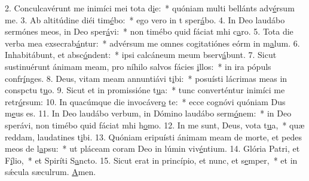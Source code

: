 2. Conculcavérunt me inimíci mei tota d\uline{i}e:~* quóniam multi bellánts adv\uline{é}rsum me.
3. Ab altitúdine diéi tim\uline{é}bo:~* ego vero in t sper\uline{á}bo.
4. In Deo laudábo sermónes meos, in Deo sper\uline{á}vi:~* non timébo quid fáciat mhi c\uline{a}ro.
5. Tota die verba mea exsecrab\uline{á}ntur:~* advérsum me omnes cogitatiónes eórm in m\uline{a}lum.
6. Inhabitábunt, et absc\uline{ó}ndent:~* ipsi calcáneum meum bserv\uline{á}bunt.
7. Sicut sustinuérunt ánimam meam, pro níhilo salvos fácies \uline{i}llos:~* in ira pópuls confr\uline{í}nges.
8. Deus, vitam meam annuntiávi t\uline{i}bi:~* posuísti lácrimas meas in conspctu t\uline{u}o.
9. Sicut et in promissióne t\uline{u}a:~* tunc converténtur inimíci me retr\uline{ó}rsum:
10. In quacúmque die invocáver\uline{o} te:~* ecce cognóvi quóniam Dus m\uline{e}us es.
11. In Deo laudábo verbum, in Dómino laudábo serm\uline{ó}nem:~* in Deo sperávi, non timébo quid fáciat mhi h\uline{o}mo.
12. In me sunt, Deus, vota t\uline{u}a,~* quæ reddam, laudatines t\uline{i}bi.
13. Quóniam eripuísti ánimam meam de morte, et pedes meos de l\uline{a}psu:~* ut pláceam coram Deo in lúmin viv\uline{é}ntium.
14. Glória Patri, et F\uline{í}lio,~* et Spiríti S\uline{a}ncto.
15. Sicut erat in princípio, et nunc, et s\uline{e}mper,~* et in sǽcula sæculrum. \uline{A}men.
